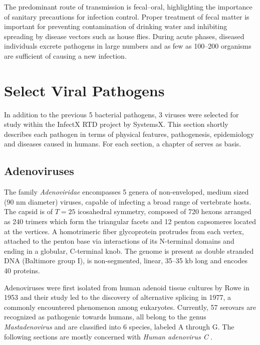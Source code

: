 The predominant route of transmission is fecal--oral, highlighting the importance of sanitary precautions for infection control. Proper treatment of fecal matter is important for preventing contamination of drinking water and inhibiting spreading by disease vectors such as house flies. During acute phases, diseased individuals excrete pathogens in large numbers and as few as 100--200 organisms are sufficient of causing a new infection.

\section{Select Viral Pathogens}

In addition to the previous 5 bacterial pathogens, 3 viruses were selected for study within the InfectX RTD project by SystemsX. This section shortly describes each pathogen in terms of physical features, pathogenesis, epidemiology and diseases caused in humans. For each section, a chapter of \cite{Craighead2000} serves as basis.

\subsection{Adenoviruses}
The family \textit{Adenoviridae} encompasses 5 genera of non-enveloped, medium sized (90 nm diameter) viruses, capable of infecting a broad range of vertebrate hosts. The capsid is of $T=25$ icosahedral symmetry, composed of 720 hexons arranged as 240 trimers which form the triangular facets and 12 penton capsomeres located at the vertices. A homotrimeric fiber glycoprotein protrudes from each vertex, attached to the penton base via interactions of its N-terminal domains and ending in a globular, C-terminal knob. The genome is present as double stranded DNA (Baltimore group I), is non-segmented, linear, 35--35 kb long and encodes 40 proteins.

Adenoviruses were first isolated from human adenoid tissue cultures by Rowe in 1953 and their study led to the discovery of alternative splicing in 1977, a commonly encountered phenomenon among eukaryotes. Currently, 57 serovars are recognized as pathogenic towards humans, all belong to the genus \textit{Mastadenovirus} and are classified into 6 species, labeled A through G. The following sections are mostly concerned with \textit{Human adenovirus C} \citep{Lenaerts2008}.

